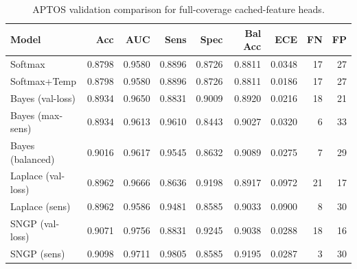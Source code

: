 \begin{table}[t]
\centering
\small
\caption{APTOS validation comparison for full-coverage cached-feature heads.}
\label{tab:aptos-models}
\begin{tabular}{lrrrrrrrr}
\toprule
Model & Acc & AUC & Sens & Spec & Bal Acc & ECE & FN & FP \\
\midrule
Softmax & 0.8798 & 0.9580 & 0.8896 & 0.8726 & 0.8811 & 0.0348 & 17 & 27 \\
Softmax+Temp & 0.8798 & 0.9580 & 0.8896 & 0.8726 & 0.8811 & 0.0186 & 17 & 27 \\
Bayes (val-loss) & 0.8934 & 0.9650 & 0.8831 & 0.9009 & 0.8920 & 0.0216 & 18 & 21 \\
Bayes (max-sens) & 0.8934 & 0.9613 & 0.9610 & 0.8443 & 0.9027 & 0.0320 & 6 & 33 \\
Bayes (balanced) & 0.9016 & 0.9617 & 0.9545 & 0.8632 & 0.9089 & 0.0275 & 7 & 29 \\
Laplace (val-loss) & 0.8962 & 0.9666 & 0.8636 & 0.9198 & 0.8917 & 0.0972 & 21 & 17 \\
Laplace (sens) & 0.8962 & 0.9586 & 0.9481 & 0.8585 & 0.9033 & 0.0900 & 8 & 30 \\
SNGP (val-loss) & 0.9071 & 0.9756 & 0.8831 & 0.9245 & 0.9038 & 0.0288 & 18 & 16 \\
SNGP (sens) & 0.9098 & 0.9711 & 0.9805 & 0.8585 & 0.9195 & 0.0287 & 3 & 30 \\
\bottomrule
\end{tabular}
\end{table}
